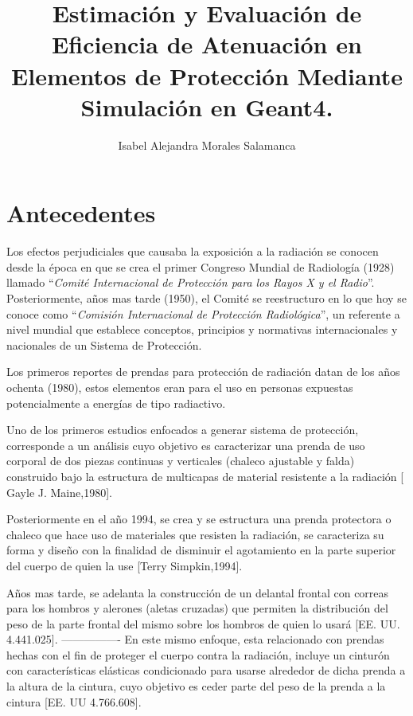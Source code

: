 \documentclass[a4paper,10pt]{article}
\title{Estimación y Evaluación de Eficiencia de Atenuación en Elementos de Protección Mediante Simulación en Geant4.}
\author{Isabel Alejandra Morales Salamanca}
\begin{document}
\maketitle

\section{Antecedentes}

Los efectos perjudiciales que causaba la exposición a la radiación se conocen desde la época  en que se crea el primer Congreso Mundial de Radiología (1928) llamado \textquotedblleft  \textit{Comité Internacional de Protección para los Rayos X y el Radio}\textquotedblright . Posteriormente, años mas tarde (1950), el Comité se reestructuro en lo que hoy se conoce como 
  \textquotedblleft\textit{Comisión Internacional de Protección Radiológica}\textquotedblright, un referente a nivel mundial que establece conceptos, principios y normativas internacionales y nacionales de un Sistema de Protección.


Los primeros reportes de prendas para protección de radiación datan de los años ochenta (1980), estos elementos eran  para el uso en personas expuestas potencialmente a energías de tipo radiactivo.

Uno de los primeros estudios enfocados a generar sistema de protección, corresponde a un análisis
cuyo objetivo es caracterizar una prenda de uso corporal de dos piezas continuas y verticales (chaleco ajustable y falda) construido bajo la estructura de multicapas de material resistente a la radiación [ Gayle J. Maine,1980].

Posteriormente en el año 1994, se crea y se estructura una prenda protectora o chaleco que hace uso de materiales que resisten la radiación, se caracteriza su forma y diseño con la finalidad de disminuir el agotamiento en la parte superior del cuerpo de quien la use [Terry Simpkin,1994].

Años mas tarde, se adelanta la  construcción de un delantal frontal con correas para los hombros y alerones (aletas cruzadas) que permiten la distribución del peso de la parte frontal del mismo sobre los hombros de quien lo usará [EE. UU. 4.441.025].%
----------------
En este mismo enfoque, esta relacionado con prendas hechas con el fin de proteger el cuerpo contra la radiación, incluye un cinturón con características elásticas condicionado para usarse  alrededor de dicha prenda a la altura de la cintura, cuyo objetivo es ceder  parte del peso de la prenda a la cintura [EE. UU 4.766.608].
\end{document}
